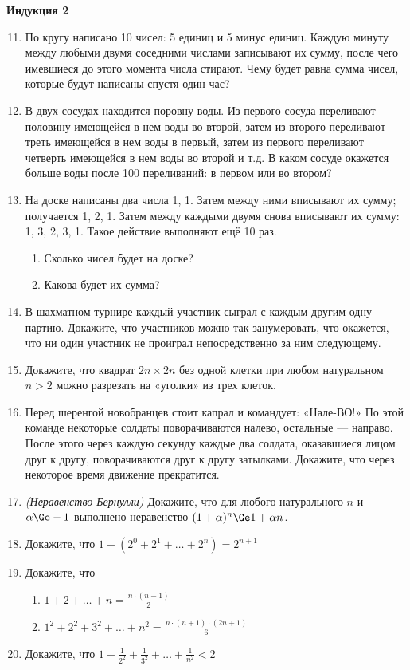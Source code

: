 \centerline{\bf \large Индукция 2}
\begin{enumerate}
\setcounter{enumi}{10}
\item По кругу написано 10 чисел: 5 единиц и 5 минус единиц. Каждую минуту между любыми двумя соседними
числами записывают их сумму, после чего имевшиеся до этого момента числа стирают. Чему будет равна
сумма чисел, которые будут написаны спустя один час?
\item В двух сосудах находится поровну воды. Из первого сосуда переливают половину имеющейся в нем
воды во второй, затем из второго переливают треть имеющейся в нем воды в первый, затем из первого
переливают четверть имеющейся в нем воды во второй и т.д. В каком сосуде окажется больше воды после
100 переливаний: в первом или во втором?
\item На доске написаны два числа 1, 1. Затем между ними вписывают их сумму; получается 1, 2, 1.
Затем между каждыми двумя снова вписывают их сумму: 1, 3, 2, 3, 1. Такое действие выполняют ещё 10
раз.
\begin{enumerate}
\item Сколько чисел будет на доске?
\item Какова будет их сумма?
\end{enumerate}
\item В шахматном турнире каждый участник сыграл с каждым другим одну партию. Докажите, что
участников можно так занумеровать, что окажется, что ни один участник не проиграл непосредственно за
ним следующему.
\item Докажите, что квадрат $2n \times 2n$  без одной клетки при любом натуральном $n > 2$ можно разрезать
на «уголки» из трех клеток.
\item Перед шеренгой новобранцев стоит капрал и командует: «Нале-ВО!» По этой команде некоторые
солдаты поворачиваются налево, остальные — направо. После этого через каждую секунду каждые два
солдата, оказавшиеся лицом друг к другу, поворачиваются друг к другу затылками. Докажите, что через
некоторое время движение прекратится.
\item {\it (Неравенство Бернулли)} Докажите, что для любого натурального $n$ и $\alpha \Ge -1$ выполнено
неравенство $(1 + \alpha)^n \Ge 1 + \alpha n$.
\item Докажите, что $1 + (2^0 + 2^1 + \ldots + 2^n) = 2^{n + 1}$
\item Докажите, что
\begin{enumerate}
\item {\Large $1 + 2 + \ldots + n = \frac{n\cdot (n - 1)}{2}$}
\item {\Large $1^2 + 2^2 + 3^2 + \ldots + n^2 = \frac{n \cdot (n + 1) \cdot (2 n + 1)}{6}$}
\end{enumerate}
\item Докажите, что $1 + \frac{1}{2^2} + \frac{1}{3^2} + \ldots + \frac{1}{n^2} < 2$
\end{enumerate}
